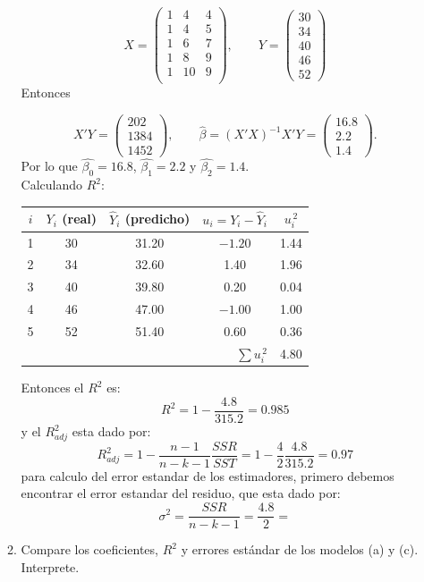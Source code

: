 \documentclass[10pt,a4paper]{article}
\begin{document}
\begin{enumerate}
\begin{enumerate}
\[
X=\begin{pmatrix}
1 & 4 & 4\\
1 & 4 & 5\\
1 & 6 & 7\\
1 & 8 & 9\\
1 & 10& 9\\
\end{pmatrix},
\qquad
Y=
\begin{pmatrix}
30\\ 34\\ 40 \\ 46 \\ 52
\end{pmatrix}
\]
Entonces

\[
X'Y=\begin{pmatrix}202\\1384\\1452\end{pmatrix},
\qquad
\hat\beta=(X'X)^{-1}X'Y=
\begin{pmatrix}
16.8\\ 2.2\\ 1.4
\end{pmatrix}.
\]
Por lo que $\hat{\beta_0}=16.8$, $\hat{\beta_1}=2.2$ y $\hat{\beta_2}=1.4$. \\
Calculando $R^2$: 
\begin{table}[H]
\centering
\begin{tabular}{|c|c|c|c|c|}
\hline
$i$ &
$Y_i$ (real) &
$\hat Y_i$ (predicho) &
$u_i = Y_i-\hat Y_i$ &
$u_i^{\,2}$ \\ 
\hline
1 & 30 & 31.20 & $-1.20$ & 1.44 \\
2 & 34 & 32.60 & \phantom{$-$}1.40 & 1.96 \\
3 & 40 & 39.80 & \phantom{$-$}0.20 & 0.04 \\
4 & 46 & 47.00 & $-1.00$ & 1.00 \\
5 & 52 & 51.40 & \phantom{$-$}0.60 & 0.36 \\[2pt]
\hline
\multicolumn{4}{r|}{$\displaystyle\sum u_i^{\,2}$} & 4.80 \\
\bottomrule
\end{tabular}
\end{table}
Entonces el $R^2$ es:
$$R^2 = 1-\frac{4.8}{315.2}=0.985$$
y el $R^2_{adj}$ esta dado por:
$$R^2_{adj} = 1- \frac{n-1}{n-k-1}\frac{SSR}{SST}=1-\frac{4}{2}\frac{4.8}{315.2}=0.97$$
para calculo del error estandar de los estimadores, primero debemos encontrar el error estandar del residuo, que esta dado por:
$$\sigma^2=\frac{SSR}{n-k-1}=\frac{4.8}{2}=$$
    \item Compare los coeficientes, \(R^{2}\) y errores estándar de los modelos
      (a) y (c). Interprete.
  \end{enumerate}
\end{enumerate}
\end{document}
